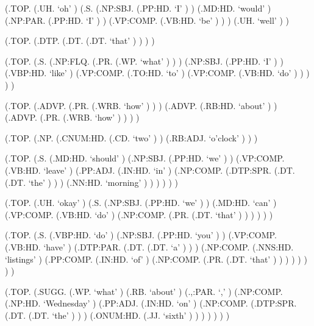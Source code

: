 \documentclass[10pt]{article}
\begin{document}
\begin{parsetree}  (.TOP. (.UH. `oh' ) (.S. (.NP:SBJ. (.PP:HD. `I' ) ) (.MD:HD. `would' ) (.NP:PAR. (.PP:HD. `I' ) ) (.VP:COMP. (.VB:HD. `be' ) ) ) (.UH. `well' ) ) \end{parsetree}

\begin{parsetree}  (.TOP. (.DTP. (.DT. (.DT. `that' ) ) ) ) \end{parsetree}

\begin{parsetree}  (.TOP. (.S. (.NP:FLQ. (.PR. (.WP. `what' ) ) ) (.NP:SBJ. (.PP:HD. `I' ) ) (.VBP:HD. `like' ) (.VP:COMP. (.TO:HD. `to' ) (.VP:COMP. (.VB:HD. `do' ) ) ) ) ) \end{parsetree}

\begin{parsetree}  (.TOP. (.ADVP. (.PR. (.WRB. `how' ) ) ) (.ADVP. (.RB:HD. `about' ) ) (.ADVP. (.PR. (.WRB. `how' ) ) ) ) \end{parsetree}

\begin{parsetree}  (.TOP. (.NP. (.CNUM:HD. (.CD. `two' ) ) (.RB:ADJ. `o'clock' ) ) ) \end{parsetree}

\begin{parsetree}  (.TOP. (.S. (.MD:HD. `should' ) (.NP:SBJ. (.PP:HD. `we' ) ) (.VP:COMP. (.VB:HD. `leave' ) (.PP:ADJ. (.IN:HD. `in' ) (.NP:COMP. (.DTP:SPR. (.DT. (.DT. `the' ) ) ) (.NN:HD. `morning' ) ) ) ) ) ) \end{parsetree}

\begin{parsetree}  (.TOP. (.UH. `okay' ) (.S. (.NP:SBJ. (.PP:HD. `we' ) ) (.MD:HD. `can' ) (.VP:COMP. (.VB:HD. `do' ) (.NP:COMP. (.PR. (.DT. `that' ) ) ) ) ) ) \end{parsetree}

\begin{parsetree}  (.TOP. (.S. (.VBP:HD. `do' ) (.NP:SBJ. (.PP:HD. `you' ) ) (.VP:COMP. (.VB:HD. `have' ) (.DTP:PAR. (.DT. (.DT. `a' ) ) ) (.NP:COMP. (.NNS:HD. `listings' ) (.PP:COMP. (.IN:HD. `of' ) (.NP:COMP. (.PR. (.DT. `that' ) ) ) ) ) ) ) ) \end{parsetree}

\begin{parsetree}  (.TOP. (.SUGG. (.WP. `what' ) (.RB. `about' ) (.,:PAR. `,' ) (.NP:COMP. (.NP:HD. `Wednesday' ) (.PP:ADJ. (.IN:HD. `on' ) (.NP:COMP. (.DTP:SPR. (.DT. (.DT. `the' ) ) ) (.ONUM:HD. (.JJ. `sixth' ) ) ) ) ) ) ) \end{parsetree}
\end{document}
